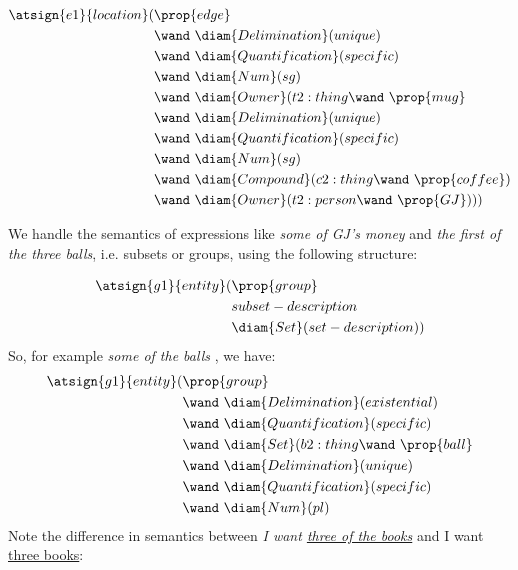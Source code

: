 \begin{align*}
\atsign{e1}{location}(& \prop{edge}  \\ 
      & \wand\ \diam{Delimination}(unique) \\
      & \wand\ \diam{Quantification}(specific) \\
      & \wand\ \diam{Num}(sg)\\
      & \wand\ \diam{Owner}(t2:thing \wand\ \prop{mug}\\
      & \wand\ \diam{Delimination}(unique) \\
      & \wand\ \diam{Quantification}(specific) \\
      & \wand\ \diam{Num}(sg)\\
      & \wand\ \diam{Compound}(c2:thing \wand\ \prop{coffee})\\
      & \wand\ \diam{Owner}(t2:person \wand\ \prop{GJ})))
\end{align*}

We handle the semantics of expressions like \emph{some of GJ's money} and  \emph{the first of the three balls}, i.e. subsets or groups, using the following structure:
\vspace{-1.5em}

\begin{align*}
\atsign{g1}{entity}(& \prop{group}  \\ 
      & subset-description \\
      & \diam{Set}( set-description ))
\end{align*}
So, for example \emph{some of the balls} , we have:
\begin{align*}
\atsign{g1}{entity}(& \prop{group}  \\ 
      & \wand\ \diam{Delimination}(existential) \\
      & \wand\ \diam{Quantification}(specific) \\
      & \wand\ \diam{Set}(b2:thing \wand\ \prop{ball}\\
      & \wand\ \diam{Delimination}(unique) \\
      & \wand\ \diam{Quantification}(specific) \\
      & \wand\ \diam{Num}(pl)
\end{align*}
Note the difference in semantics between \emph{I want \underline{three of the books}} and {I want \underline{three books}}:
\vspace{-1.5em}

